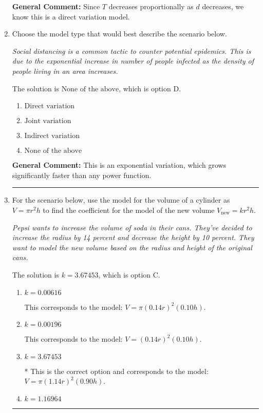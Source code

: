 \documentclass{extbook}[14pt]
\newcommand{\litem}[1]{\item #1

\rule{\textwidth}{0.4pt}}
\begin{document}
\begin{enumerate}
{\textbf{General Comment:} Since $T$ decreases proportionally as $d$ decreases, we know this is a direct variation model.
}
\litem{
Choose the model type that would best describe the scenario below.

\begin{center}
    \textit{ Social distancing is a common tactic to counter potential epidemics. This is due to the exponential increase in number of people infected as the density of people living in an area increases. }
\end{center}
The solution is \( \text{None of the above} \), which is option D.\begin{enumerate}[label=\Alph*.]
\item \( \text{Direct variation} \)


\item \( \text{Joint variation} \)


\item \( \text{Indirect variation} \)


\item \( \text{None of the above} \)


\end{enumerate}

\textbf{General Comment:} This is an exponential variation, which grows significantly faster than any power function.
}
\litem{
For the scenario below, use the model for the volume of a cylinder as $V = \pi r^2 h$ to find the coefficient for the model of the new volume $V_{\text{new}} = k r^2 h$.

\begin{center}
    \textit{ Pepsi wants to increase the volume of soda in their cans. They've decided to increase the radius by 14 percent and decrease the height by 10 percent. They want to model the new volume based on the radius and height of the original cans. }
\end{center}
The solution is \( k = 3.67453 \), which is option C.\begin{enumerate}[label=\Alph*.]
\item \( k = 0.00616 \)

This corresponds to the model: $V = \pi (0.14 r)^2 (0.10 h)$.
\item \( k = 0.00196 \)

This corresponds to the model: $V = (0.14 r)^2 (0.10 h)$.
\item \( k = 3.67453 \)

* This is the correct option and corresponds to the model: $V = \pi (1.14 r)^2 (0.90 h)$.
\item \( k = 1.16964 \)


\end{enumerate}}
\end{enumerate}
\end{document}
